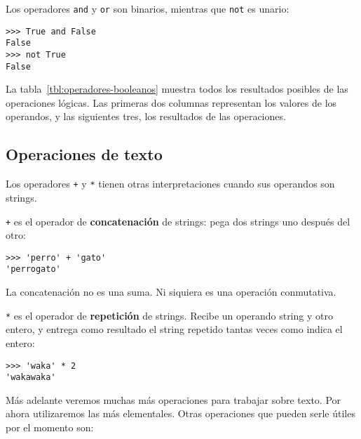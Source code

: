 Los operadores \lstinline!and! y \lstinline!or! son binarios, mientras
que \lstinline!not! es unario:

\begin{lstlisting}
>>> True and False
False
>>> not True
False
\end{lstlisting}

La tabla~\ref{tbl:operadores-booleanos} muestra todos los resultados posibles de las
operaciones lógicas. Las primeras dos columnas representan los valores
de los operandos, y las siguientes tres, los resultados de las
operaciones.

\subsection{Operaciones de texto}

Los operadores \lstinline!+! y \lstinline!*! tienen otras
interpretaciones cuando sus operandos son strings.

\lstinline!+! es el operador de \textbf{concatenación} de strings: pega
dos strings uno después del otro:

\begin{lstlisting}
>>> 'perro' + 'gato'
'perrogato'
\end{lstlisting}

La concatenación no es una suma. Ni siquiera es una operación
conmutativa.

\lstinline!*! es el operador de \textbf{repetición} de strings. Recibe
un operando string y otro entero, y entrega como resultado el string
repetido tantas veces como indica el entero:

\begin{lstlisting}
>>> 'waka' * 2
'wakawaka'
\end{lstlisting}

Más adelante veremos muchas más operaciones para trabajar sobre texto.
Por ahora utilizaremos las más elementales. Otras operaciones que pueden
serle útiles por el momento son:

